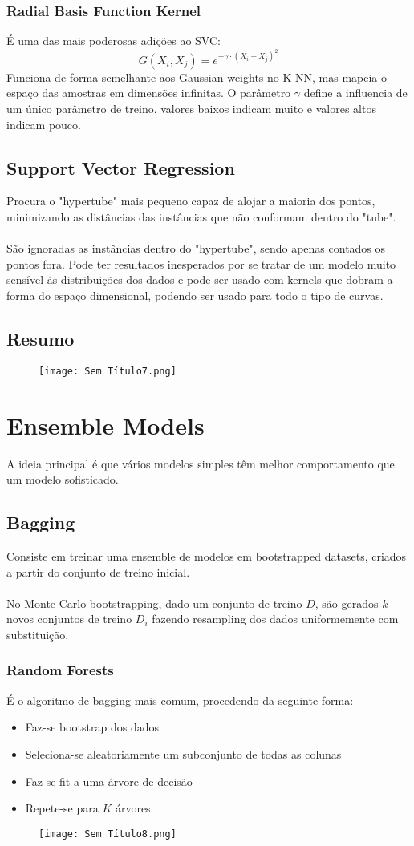 \documentclass[10pt,a4paper]{report}
\begin{document}
\subsubsection{Radial Basis Function Kernel}
É uma das mais poderosas adições ao SVC:
$$
G(X_i,X_j) = e^{-\gamma \cdot (X_i - X_j)^2}
$$
Funciona de forma semelhante aos Gaussian weights no K-NN, mas mapeia o espaço das amostras em dimensões infinitas. O parâmetro $\gamma$ define a influencia de um único parâmetro de treino, valores baixos indicam muito e valores altos indicam pouco.
\subsection{Support Vector Regression}
Procura o "hypertube" mais pequeno capaz de alojar a maioria dos pontos, minimizando as distâncias das instâncias que não conformam dentro do "tube".\\
\\
São ignoradas as instâncias dentro do "hypertube", sendo apenas contados os pontos fora. Pode ter resultados inesperados por se tratar de um modelo muito sensível ás distribuições dos dados e pode ser usado com kernels que dobram a forma do espaço dimensional, podendo ser usado para todo o tipo de curvas.
\subsection{Resumo}
\begin{figure}[H]
\centering
\texttt{[image: Sem Título7.png]}
\end{figure}
\section{Ensemble Models}
A ideia principal é que vários modelos simples têm melhor comportamento que um modelo sofisticado.
\subsection{Bagging}
Consiste em treinar uma ensemble de modelos em bootstrapped datasets, criados a partir do conjunto de treino inicial.\\
\\
No Monte Carlo bootstrapping, dado um conjunto de treino $D$, são gerados $k$ novos conjuntos de treino $D_i$ fazendo resampling dos dados uniformemente com substituição.
\subsubsection{Random Forests}
É o algoritmo de bagging mais comum, procedendo da seguinte forma:
\begin{itemize}
\item Faz-se bootstrap dos dados
\item Seleciona-se aleatoriamente um subconjunto de todas as colunas
\item Faz-se fit a uma árvore de decisão
\item Repete-se para $K$ árvores
\end{itemize}
\begin{figure}[H]
\centering
\texttt{[image: Sem Título8.png]}
\end{figure}
\end{document}
